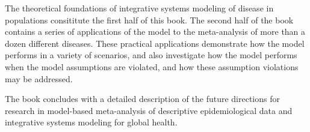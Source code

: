 The theoretical foundations of integrative systems modeling of disease
in populations consititute the first half of this book.  The second
half of the book contains a series of applications of the model to the
meta-analysis of more than a dozen different diseases.  These
practical applications demonstrate how the model performs in a variety
of scenarios, and also investigate how the model performs when the
model assumptions are violated, and how these assumption violations
may be addressed.

The book concludes with a detailed description of the future
directions for research in model-based meta-analysis of descriptive
epidemiological data and integrative systems modeling for global
health.

